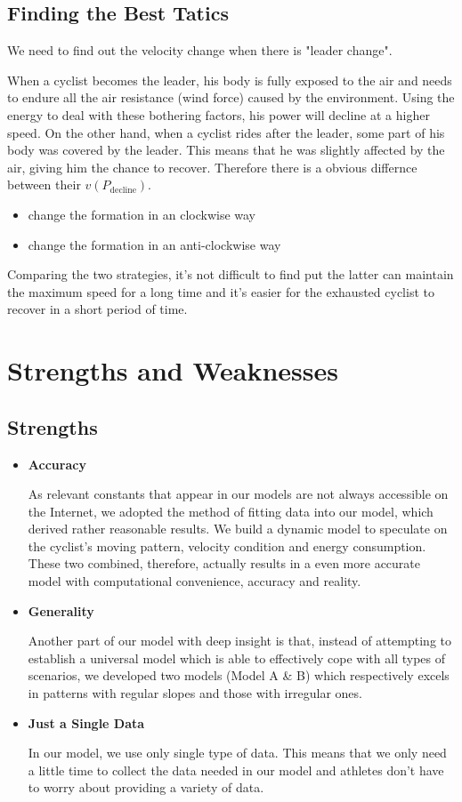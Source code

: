 \documentclass[14pt]{article}
\newcommand{\itembf}{\item \textbf}
\theoremstyle{definition}
\theoremstyle{remark}
\numberwithin{equation}{section}
\begin{document}
	\subsection{Finding the Best Tatics}
	We need to find out the velocity change when there is "leader change".
	
	When a cyclist becomes the leader, his body is fully exposed to the air and needs to endure all the air resistance (wind force) caused by the environment. Using the energy to deal with these bothering factors, his power will decline at a higher speed. On the other hand, when a cyclist rides after the leader, some part of his body was covered by the leader. This means that he was slightly affected by the air, giving him the chance to recover. Therefore there is a obvious differnce between their $v(P_\mathrm{decline})$.
	\begin{itemize}
		\item change the formation in an clockwise way
		\item change the formation in an anti-clockwise way
	\end{itemize} 
	Comparing the two strategies, it's not difficult to find put the latter can maintain the maximum speed for a long time and it's easier for the exhausted cyclist to recover in a short period of time.
	\section{Strengths and Weaknesses}
	\subsection*{Strengths}
	\begin{itemize}
		\itembf{Accuracy}
		
			As relevant constants that appear in our models are not always accessible on the Internet, we adopted the method of fitting data into our model, which derived rather reasonable results. We build a dynamic model to speculate on the cyclist's moving pattern, velocity condition and energy consumption. These two combined, therefore, actually results in a even more accurate model with computational convenience, accuracy and reality.
		\itembf{Generality}

			Another part of our model with deep insight is that, instead of attempting to establish a universal model which is able to effectively cope with all types of scenarios, we developed two models (Model A \& B) which respectively excels in patterns with regular slopes and those with irregular ones. 
		\itembf{Just a Single Data}

			In our model, we use only single type of data. This means that we only need a little time to collect the data needed in our model and athletes don't have to worry about providing a variety of data.
	\end{itemize}
\end{document}
